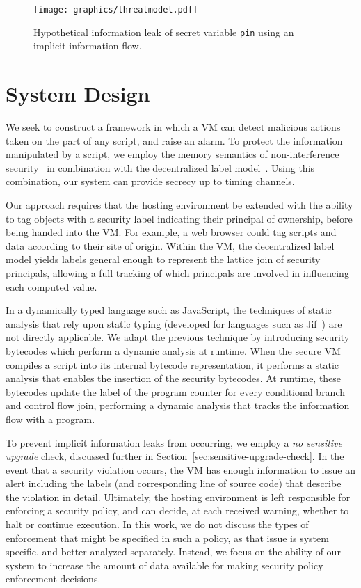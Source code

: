 \documentclass{llncs}
\begin{document}
\begin{figure}[ht]
  \centerline{\texttt{[image: graphics/threatmodel.pdf]}}
  \caption{Hypothetical information leak of secret variable \texttt{pin} using an implicit information flow.}
  \label{fig:threat-model}
\end{figure}


\section{System Design}
\label{sec:system-design}

We seek to construct a framework in which a VM can detect malicious actions taken on the part of any script, and raise an alarm.
To protect the information manipulated by a script, we employ the memory semantics of non-interference security~\cite{goguen1982security} in combination with the decentralized label model~\cite{363526}.
Using this combination, our system can provide secrecy up to timing channels.

Our approach requires that the hosting environment be extended with the ability to tag objects with a security label indicating their principal of ownership, before being handed into the VM.
For example, a web browser could tag scripts and data according to their site of origin.
Within the VM, the decentralized label model yields labels general enough to represent the lattice join of security principals, allowing a full tracking of which principals are involved in influencing each computed value.

In a dynamically typed language such as JavaScript, the techniques of static analysis that rely upon static typing (developed for languages such as Jif~\cite{myers2001jif}) are not directly applicable.
We adapt the previous technique by introducing security bytecodes which perform a dynamic analysis at runtime.
When the secure VM compiles a script into its internal bytecode representation, it performs a static analysis that enables the insertion of the security bytecodes.
At runtime, these bytecodes update the label of the program counter for every conditional branch and control flow join, performing a dynamic analysis that tracks the information flow with a program.

To prevent implicit information leaks from occurring, we employ a \textit{no sensitive upgrade} check, discussed further in Section~\ref{sec:sensitive-upgrade-check}.
In the event that a security violation occurs, the VM has enough information to issue an alert including the labels (and corresponding line of source code) that describe the violation in detail.
Ultimately, the hosting environment is left responsible for enforcing a security policy, and can decide, at each received warning, whether to halt or continue execution.
In this work, we do not discuss the types of enforcement that might be specified in such a policy, as that issue is system specific, and better analyzed separately.
Instead, we focus on the ability of our system to increase the amount of data available for making security policy enforcement decisions.
\end{document}

